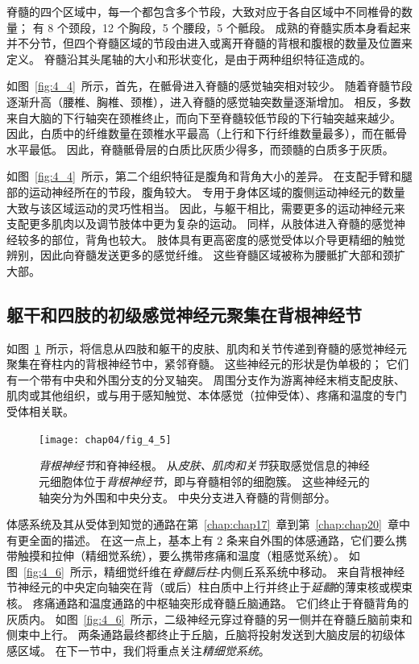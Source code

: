 脊髓的四个区域中，每一个都包含多个节段，大致对应于各自区域中不同椎骨的数量；
有 8 个颈段，12 个胸段，5 个腰段，5 个骶段。
成熟的脊髓实质本身看起来并不分节，但四个脊髓区域的节段由进入或离开脊髓的背根和腹根的数量及位置来定义。
脊髓沿其头尾轴的大小和形状变化，是由于两种组织特征造成的。


如图~\ref{fig:4_4}~所示，首先，在骶骨进入脊髓的感觉轴突相对较少。
随着脊髓节段逐渐升高（腰椎、胸椎、颈椎），进入脊髓的感觉轴突数量逐渐增加。
相反，多数来自大脑的下行轴突在颈椎终止，而向下至脊髓较低节段的下行轴突越来越少。
因此，白质中的纤维数量在颈椎水平最高（上行和下行纤维数量最多），而在骶骨水平最低。
因此，脊髓骶骨层的白质比灰质少得多，而颈髓的白质多于灰质。


如图~\ref{fig:4_4}~所示，第二个组织特征是腹角和背角大小的差异。
在支配手臂和腿部的运动神经所在的节段，腹角较大。
专用于身体区域的腹侧运动神经元的数量大致与该区域运动的灵巧性相当。
因此，与躯干相比，需要更多的运动神经元来支配更多肌肉以及调节肢体中更为复杂的运动。
同样，从肢体进入脊髓的感觉神经较多的部位，背角也较大。
肢体具有更高密度的感觉受体以介导更精细的触觉辨别，因此向脊髓发送更多的感觉纤维。
这些脊髓区域被称为腰骶扩大部和颈扩大部。



\subsection{躯干和四肢的初级感觉神经元聚集在背根神经节}

如图~\ref{fig:4_5}~所示，将信息从四肢和躯干的皮肤、肌肉和关节传递到脊髓的感觉神经元聚集在脊柱内的背根神经节中，紧邻脊髓。
这些神经元的形状是伪单极的；
它们有一个带有中央和外围分支的分叉轴突。
周围分支作为游离神经末梢支配皮肤、肌肉或其他组织，或与用于感知触觉、本体感觉（拉伸受体）、疼痛和温度的专门受体相关联。


\begin{figure}[htbp]
	\centering
	\texttt{[image: chap04/fig\_4\_5]}
	\caption{\textit{背根神经节}和脊神经根。
		从\textit{皮肤、肌肉和关节}获取感觉信息的神经元细胞体位于\textit{背根神经节}，即与脊髓相邻的细胞簇。
		这些神经元的轴突分为外围和中央分支。 
		中央分支进入脊髓的背侧部分。}
	\label{fig:4_5}
\end{figure}


体感系统及其从受体到知觉的通路在第~\ref{chap:chap17}~章到第~\ref{chap:chap20}~章中有更全面的描述。
在这一点上，基本上有 2 条来自外围的体感通路，它们要么携带触摸和拉伸（精细觉系统），要么携带疼痛和温度（粗感觉系统）。
如图~\ref{fig:4_6}~所示，精细觉纤维在\textit{脊髓后柱}-内侧丘系系统中移动。
来自背根神经节神经元的中央定向轴突在背（或后）柱白质中上行并终止于\textit{延髓}的薄束核或楔束核。
疼痛通路和温度通路的中枢轴突形成脊髓丘脑通路。
它们终止于脊髓背角的灰质内。
如图~\ref{fig:4_6}~所示，二级神经元穿过脊髓的另一侧并在脊髓丘脑前束和侧束中上行。 
两条通路最终都终止于丘脑，丘脑将投射发送到大脑皮层的初级体感区域。
在下一节中，我们将重点关注\textit{精细觉系统}。


